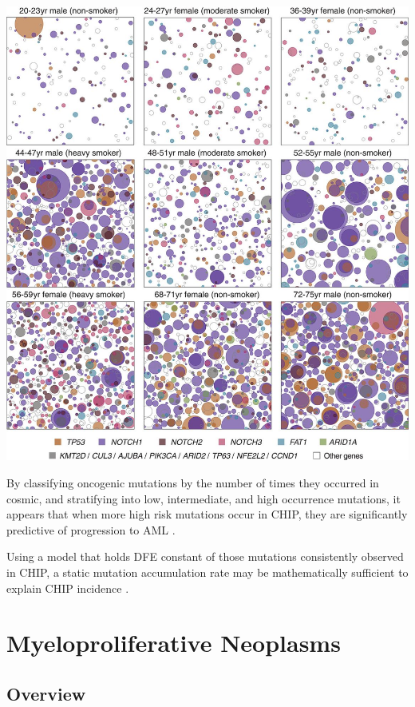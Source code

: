 \documentclass[]{book}
\begin{document}
\includegraphics{images/04-5.jpg}

By classifying oncogenic mutations by the number of times they occurred
in cosmic, and stratifying into low, intermediate, and high occurrence
mutations, it appears that when more high risk mutations occur in CHIP,
they are significantly predictive of progression to AML
\citep{abelson2018prediction}.

Using a model that holds DFE constant of those mutations consistently
observed in CHIP, a static mutation accumulation rate may be
mathematically sufficient to explain CHIP incidence
\citep{Watson2019-lg}.

\section{Myeloproliferative
Neoplasms}\label{myeloproliferative-neoplasms}

\subsection{Overview}\label{overview}
\end{document}
